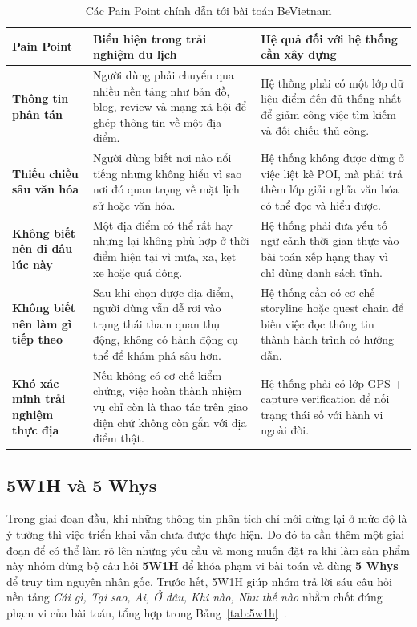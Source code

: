 \begin{table}[H]
\centering
\caption{Các Pain Point chính dẫn tới bài toán BeVietnam}
\label{tab:problem_pain_points}
\begin{tabularx}{\textwidth}{>{\raggedright\arraybackslash}p{3.1cm} X >{\raggedright\arraybackslash}p{3.6cm}}
\toprule
\textbf{Pain Point} & \textbf{Biểu hiện trong trải nghiệm du lịch} & \textbf{Hệ quả đối với hệ thống cần xây dựng} \\
\midrule
\textbf{Thông tin phân tán} & Người dùng phải chuyển qua nhiều nền tảng như bản đồ, blog, review và mạng xã hội để ghép thông tin về một địa điểm. & Hệ thống phải có một lớp dữ liệu điểm đến đủ thống nhất để giảm công việc tìm kiếm và đối chiếu thủ công. \\
\textbf{Thiếu chiều sâu văn hóa} & Người dùng biết nơi nào nổi tiếng nhưng không hiểu vì sao nơi đó quan trọng về mặt lịch sử hoặc văn hóa. & Hệ thống không được dừng ở việc liệt kê POI, mà phải trả thêm lớp giải nghĩa văn hóa có thể đọc và hiểu được. \\
\textbf{Không biết nên đi đâu lúc này} & Một địa điểm có thể rất hay nhưng lại không phù hợp ở thời điểm hiện tại vì mưa, xa, kẹt xe hoặc quá đông. & Hệ thống phải đưa yếu tố ngữ cảnh thời gian thực vào bài toán xếp hạng thay vì chỉ dùng danh sách tĩnh. \\
\textbf{Không biết nên làm gì tiếp theo} & Sau khi chọn được địa điểm, người dùng vẫn dễ rơi vào trạng thái tham quan thụ động, không có hành động cụ thể để khám phá sâu hơn. & Hệ thống cần có cơ chế storyline hoặc quest chain để biến việc đọc thông tin thành hành trình có hướng dẫn. \\
\textbf{Khó xác minh trải nghiệm thực địa} & Nếu không có cơ chế kiểm chứng, việc hoàn thành nhiệm vụ chỉ còn là thao tác trên giao diện chứ không còn gắn với địa điểm thật. & Hệ thống phải có lớp GPS + capture verification để nối trạng thái số với hành vi ngoài đời. \\
\bottomrule
\end{tabularx}
\end{table}

\subsection{5W1H và 5 Whys}
\contrib

Trong giai đoạn đầu, khi những thông tin phân tích chỉ mới dừng lại ở mức độ là ý tưởng thì việc triển khai
vẫn chưa được thực hiện. Do đó ta cần thêm một giai đoạn để có thể làm rõ lên những yêu cầu và mong muốn đặt ra
khi làm sản phẩm này nhóm dùng bộ câu hỏi
\textbf{5W1H} để khóa phạm vi bài toán và dùng \textbf{5 Whys} để truy
tìm nguyên nhân gốc. Trước hết, 5W1H giúp nhóm trả lời sáu câu hỏi nền
tảng \textit{Cái gì, Tại sao, Ai, Ở đâu, Khi nào, Như thế nào}
nhằm chốt đúng phạm vi của bài toán, tổng hợp trong
Bảng~\ref{tab:5w1h}~\cite{bevietnam_spec}.

